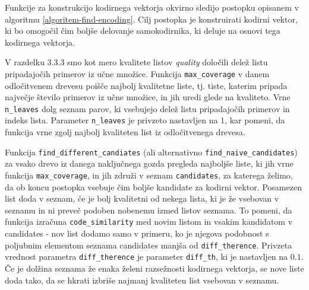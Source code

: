 \documentclass[12pt,a4paper,twoside]{article}
\theoremstyle{definition} %
\theoremstyle{plain} %
\numberwithin{equation}{section}  %
\begin{document}


Funkcije za konstrukcijo kodirnega vektorja okvirno sledijo postopku opisanem v algoritmu \ref{algoritem-find-encoding}.
Cilj postopka je konstruirati kodirni vektor, ki bo omogočil čim boljše delovanje samokodirnika, ki deluje na osnovi tega kodirnega vektorja. %

V razdelku 3.3.3 smo kot mero kvalitete listov \textit{quality} določili delež listu pripadajočih primerov iz učne množice. 
Funkcija \texttt{max\_coverage} v danem odločitvenem drevesu poišče najbolj kvalitetne liste, tj. tiste, katerim pripada največje število primerov iz učne množice, in jih uredi glede na kvaliteto.
Vrne \texttt{n\_leaves} dolg seznam parov, ki vsebujejo delež listu pripadajočih primerov in indeks lista. 
Parameter \texttt{n\_leaves} je privzeto nastavljen na 1, kar pomeni, da funkcija vrne zgolj najbolj kvaliteten list iz odločitvenega drevesa.

Funkcija \texttt{find\_different\_candiates} (ali alternativno \texttt{find\_naive\_candidates}) za vsako drevo iz danega naključnega gozda pregleda najboljše liste, 
ki jih vrne funkcija \texttt{max\_coverage}, in jih združi v seznam \texttt{candidates}, za katerega želimo, da ob koncu postopka vsebuje čim boljše kandidate za kodirni vektor.
Posamezen list doda v seznam, če je bolj kvalitetni od nekega lista, ki je že vsebovan v seznamu in ni preveč podoben nobenemu izmed listov seznama.
To pomeni, da funkcija izračuna \texttt{code\_similarity} med novim listom in vsakim kandidatom v candidates - nov list dodamo samo v primeru, ko je njegova podobnost s poljubnim elementom seznama candidates manjša od \texttt{diff\_therence}.
Privzeta vrednost parametra \texttt{diff\_therence} je parameter \texttt{diff\_th}, ki je nastavljen na $0.1$.
Če je dolžina seznama že enaka želeni razsežnosti kodirnega vektorja, se nove liste doda tako, da se hkrati izbriše najmanj kvaliteten list vsebovan v seznamu.
\end{document}
